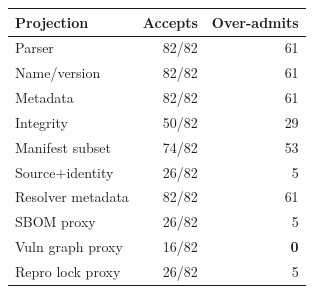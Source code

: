 \begin{tabular}{lrr}
\toprule
Projection & Accepts & Over-admits \\
\midrule
Parser & 82/82 & 61 \\
Name/version & 82/82 & 61 \\
Metadata & 82/82 & 61 \\
Integrity & 50/82 & 29 \\
Manifest subset & 74/82 & 53 \\
Source+identity & 26/82 & 5 \\
Resolver metadata & 82/82 & 61 \\
SBOM proxy & 26/82 & 5 \\
Vuln graph proxy & 16/82 & \textbf{0} \\
Repro lock proxy & 26/82 & 5 \\
\bottomrule
\end{tabular}
